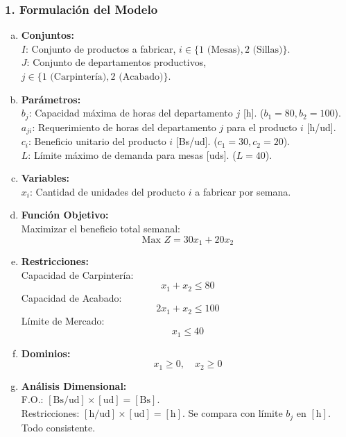 \documentclass{article}
\begin{document}
	\subsubsection*{1. Formulación del Modelo}
	\begin{enumerate}[a)]
		\item \textbf{Conjuntos:}\\
		$I$: Conjunto de productos a fabricar, $i \in \{1 \text{ (Mesas)}, 2 \text{ (Sillas)}\}$.\\
		$J$: Conjunto de departamentos productivos, $j \in \{1 \text{ (Carpintería)}, 2 \text{ (Acabado)}\}$.
		
		\item \textbf{Parámetros:}\\
		$b_j$: Capacidad máxima de horas del departamento $j$ [h]. ($b_1=80, b_2=100$).\\
		$a_{ji}$: Requerimiento de horas del departamento $j$ para el producto $i$ [h/ud].\\
		$c_i$: Beneficio unitario del producto $i$ [Bs/ud]. ($c_1=30, c_2=20$).\\
		$L$: Límite máximo de demanda para mesas [uds]. ($L=40$).
		
		\item \textbf{Variables:}\\
		$x_i$: Cantidad de unidades del producto $i$ a fabricar por semana.
		
		\item \textbf{Función Objetivo:}\\
		Maximizar el beneficio total semanal:
		$$ \text{Max } Z = 30x_1 + 20x_2 $$
		
		\item \textbf{Restricciones:}\\
		Capacidad de Carpintería: $$ x_1 + x_2 \leq 80 $$
		Capacidad de Acabado: $$ 2x_1 + x_2 \leq 100 $$
		Límite de Mercado: $$ x_1 \leq 40 $$
		
		\item \textbf{Dominios:}\\
		$$ x_1 \geq 0, \quad x_2 \geq 0 $$
		
		\item \textbf{Análisis Dimensional:}\\
		F.O.: $[\text{Bs/ud}] \times [\text{ud}] = [\text{Bs}]$. \\
		Restricciones: $[\text{h/ud}] \times [\text{ud}] = [\text{h}]$. Se compara con límite $b_j$ en $[\text{h}]$. Todo consistente.
	\end{enumerate}
	
\end{document}
